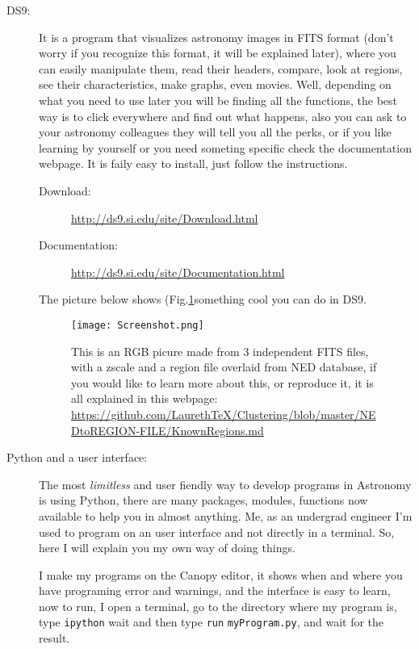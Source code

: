 \documentclass[11pt,fleqn]{book} %
\begin{document}
\begin{description}
	\item[DS9:] It is a program that visualizes astronomy images in FITS format (don't worry if you recognize this format, it will be explained later), where you can easily manipulate them, read their headers, compare, look at regions, see their characteristics, make graphs, even movies. Well, depending on what you need to use later you will be finding all the functions, the best way is to click everywhere and find out what happens, also you can ask to your astronomy colleagues they will tell you all the perks, or if you like learning by yourself or you need someting specific check the documentation webpage. It is faily easy to install, just follow the instructions.
    	\begin{description}
        	\item[Download: ]\url{http://ds9.si.edu/site/Download.html}
            \item[Documentation: ]\url{http://ds9.si.edu/site/Documentation.html}
        \end{description}
        The picture below shows (Fig.\ref{fig:screen}something cool you can do in DS9.
        \begin{figure}[h]
        	\centering
    \texttt{[image: Screenshot.png]}
    \caption{This is an RGB picure made from 3 independent FITS files, with a zscale and a region file overlaid from NED database, if you would like to learn more about this, or reproduce it, it is all explained in this webpage: \url{https://github.com/LaurethTeX/Clustering/blob/master/NEDtoREGION-FILE/KnownRegions.md}}
    \label{fig:screen}
        \end{figure}
        
    \item[Python and a user interface: ]The most \emph{limitless} and user fiendly way to develop programs in Astronomy is using Python, there are many packages, modules, functions now available to help you in almost anything. Me, as an undergrad engineer I'm used to program on an user interface and not directly in a terminal. So, here I will explain you my own way of doing things.
    
    I make my programs on the Canopy editor, it shows when and where you have programing error and warnings, and the interface is easy to learn, now to run, I open a terminal, go to the directory where my program is, type \verb|ipython| wait and then type \verb|run| \verb|myProgram.py|, and wait for the result.
    

\end{description}
\end{document}
